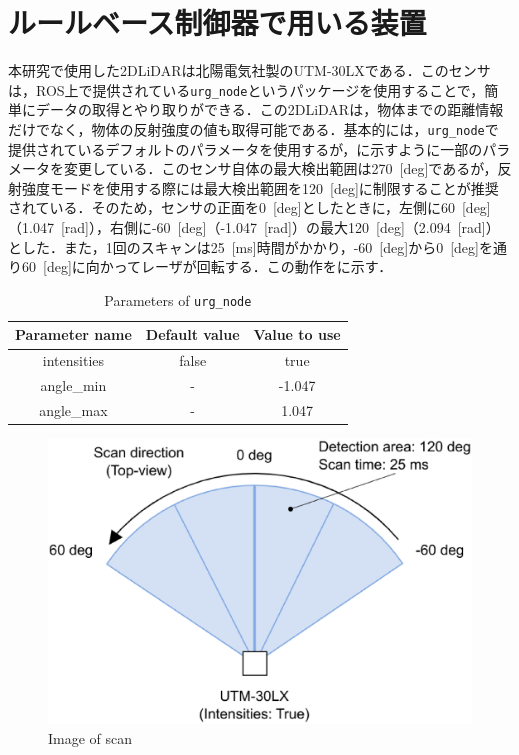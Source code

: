 
\section{ルールベース制御器で用いる装置}

  本研究で使用した2DLiDARは北陽電気社製のUTM-30LX\cite{hokuyo}である．このセンサは，ROS上で提供されている\texttt{urg\_node}\cite{urg_node}というパッケージを使用することで，簡単にデータの取得とやり取りができる．この2DLiDARは，物体までの距離情報だけでなく，物体の反射強度の値も取得可能である．基本的には，\texttt{urg\_node}で提供されているデフォルトのパラメータを使用するが，に示すように一部のパラメータを変更している．このセンサ自体の最大検出範囲は270 \,[deg]であるが，反射強度モードを使用する際には最大検出範囲を120 \,[deg]に制限することが推奨されている\cite{urg_node}．そのため，センサの正面を0 \,[deg]としたときに，左側に60 \,[deg]（1.047 \,[rad]），右側に-60 \,[deg]（-1.047 \,[rad]）の最大120 \,[deg]（2.094 \,[rad]）とした．また，1回のスキャンは25 \,[ms]時間がかかり，-60 \,[deg]から0 \,[deg]を通り60 \,[deg]に向かってレーザが回転する．この動作をに示す．

  \begin{table}[hbtp]
    \caption{Parameters of \texttt{urg\_node}}
    \label{tab:parameters_of_urg_node}
    \centering
    \begin{tabular}{ccc}
    \hline
    Parameter name & Default value & Value to use \\ 
    \hline
    \hline
    intensities & false   & true         \\ 
    angle\_min  & -       & -1.047       \\ 
    angle\_max  & -       & 1.047        \\ 
    \hline
    \end{tabular}
    \end{table}

    \begin{figure}[h]
      \centering
      \includegraphics[keepaspectratio, scale=0.30] {images/eps/RobotGuidance_hokuyo_scan}
      \captionsetup{justification=raggedright} %
      \caption{Image of scan}
      \label{Fig:Image of scan}
    \end{figure}

\newpage
